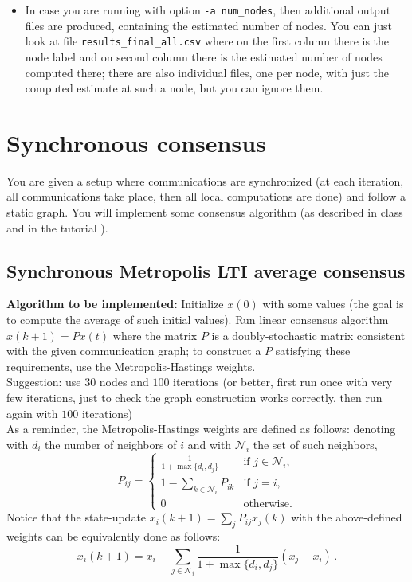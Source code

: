 \documentclass{article}
\newcommand{\mc}{\mathcal}
\begin{document}
\begin{itemize}
\begin{itemize}
        \item In case you are running with option \verb=-a num_nodes=, then additional output files are produced, containing the estimated number of nodes. You can just look at file \verb=results_final_all.csv= where on the first column there is the node label and on second column there is the estimated number of nodes computed there; there are also individual files, one per node, with just the computed estimate at such a node, but you can ignore them.
    \end{itemize}
\end{itemize}



\section{Synchronous consensus}
You are given a setup where communications are synchronized (at each iteration, all communications take place, then all local computations are done) and follow a static graph.
You will implement some consensus algorithm (as described in class and in the tutorial \cite{consensus-tutorial}).


\subsection{Synchronous Metropolis LTI average consensus}
\textbf{Algorithm to be implemented:}
Initialize $x(0)$ with some values (the goal is to compute the average of such initial values). Run linear consensus algorithm $x(k+1) = P x(t)$ where the matrix $P$ is a doubly-stochastic matrix consistent with the given communication graph; to construct a $P$ satisfying these requirements, use the Metropolis-Hastings weights. \\
Suggestion: use $30$ nodes and $100$ iterations (or better, first run once with very few iterations, just to check the graph construction works correctly, then run again with $100$ iterations)\\

As a reminder, the Metropolis-Hastings weights are defined as follows:
denoting with $d_i$ the number of neighbors of $i$ and with $\mc N_i$ the set of such neighbors,
\[ P_{ij} =
\begin{cases}
\frac{1}{1+\max\{d_i, d_j \}} & \text{if $j \in \mc N_i$,}\\
1-\sum_{k \in \mc N_i} P_{ik} & \text{if $j = i$,}\\
0							  & \text{otherwise}.
\end{cases}
\]
Notice that the state-update $x_i(k+1) = \sum_j P_{ij} x_j(k)$ with the above-defined weights can be equivalently done as follows:
\[ x_i(k+1) = x_i + \sum_{j \in \mc N_i} \frac{1}{1+\max\{d_i, d_j \}} (x_j - x_i) \,.\]
\end{document}
